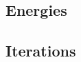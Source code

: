 \documentclass{article}
\begin{document}
\subsection*{Energies}
\label{sec:qho-energies}

\subsection*{Iterations}
\label{sec:qho-iterations}
\end{document}
